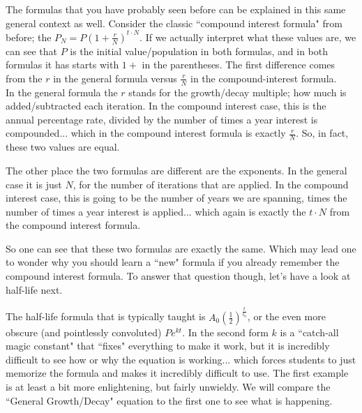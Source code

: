 \documentclass{ximera}
\begin{document}
        The formulas that you have probably seen before can be explained in this same general context as well. Consider the classic ``compound interest formula" from before; the $P_N = P\left(1 + \frac{r}{N}\right)^{t \cdot N}$. If we actually interpret what these values are, we can see that $P$ is the initial value/population in both formulas, and in both formulas it has starts with $1 +$ in the parentheses. The first difference comes from the $r$ in the general formula versus $\frac{r}{N}$ in the compound-interest formula. \\
        
        In the general formula the $r$ stands for the growth/decay multiple; how much is added/subtracted each iteration. In the compound interest case, this is the annual percentage rate, divided by the number of times a year interest is compounded... which in the compound interest formula is exactly $\frac{r}{N}$. So, in fact, these two values are equal.
        
        The other place the two formulas are different are the exponents. In the general case it is just $N$, for the number of iterations that are applied. In the compound interest case, this is going to be the number of years we are spanning, times the number of times a year interest is applied... which again is exactly the $t \cdot N$ from the compound interest formula. 
        
        So one can see that these two formulas are exactly the same. Which may lead one to wonder why you should learn a ``new" formula if you already remember the compound interest formula. To answer that question though, let's have a look at half-life next.
        
        
        The half-life formula that is typically taught is $A_0\left(\frac{1}{2}\right)^{\frac{t}{t_0}}$, or the even more obscure (and pointlessly convoluted) $Pe^{kt}$. In the second form $k$ is a ``catch-all magic constant" that ``fixes" everything to make it work, but it is incredibly difficult to see how or why the equation is working... which forces students to just memorize the formula and makes it incredibly difficult to use. The first example is at least a bit more enlightening, but fairly unwieldy. We will compare the ``General Growth/Decay" equation to the first one to see what is happening.
        
\end{document}
